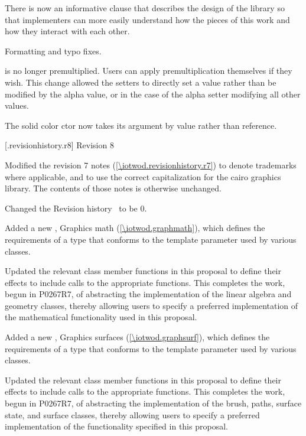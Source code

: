 \pnum
There is now an informative clause that describes the design of the library so that implementers can more easily understand how the pieces of this \documenttypename{} work and how they interact with each other.

\pnum
Formatting and typo fixes.

\pnum
{} is no longer premultiplied. Users can apply premultiplication themselves if they wish. This change allowed the setters to directly set a value rather than be modified by the alpha value, or in the case of the alpha setter modifying all other values.

\pnum
The solid color  ctor now takes its  argument by value rather than reference.

 [\iotwod.revisionhistory.r8] {Revision 8}

\pnum
Modified the revision 7 notes (\ref{\iotwod.revisionhistory.r7}) to denote trademarks where applicable, and to use the correct capitalization for the cairo graphics library. The contents of those notes is otherwise unchanged.

\pnum
Changed the Revision history \clause{}\, to be \clause{} 0.

\pnum
Added a new \clause, Graphics math (\ref{\iotwod.graphmath}), which defines the requirements of a type that conforms to the \graphicsmathtemplparam template parameter used by various classes.

\pnum
Updated the relevant class member functions in this proposal to define their effects to include calls to the appropriate \graphicsmathtemplparam functions. This completes the work, begun in P0267R7, of abstracting the implementation of the linear algebra and geometry classes, thereby allowing users to specify a preferred implementation of the mathematical functionality used in this proposal.

\pnum
Added a new \clause{}, Graphics surfaces (\ref{\iotwod.graphsurf}), which defines the requirements of a type that conforms to the \graphicssurfacestemplparam template parameter used by various classes.

\pnum
Updated the relevant class member functions in this proposal to define their effects to include calls to the appropriate \graphicssurfacestemplparam functions. This completes the work, begun in P0267R7, of abstracting the implementation of the brush, paths, surface state, and surface classes, thereby allowing users to specify a preferred implementation of the functionality specified in this proposal.

